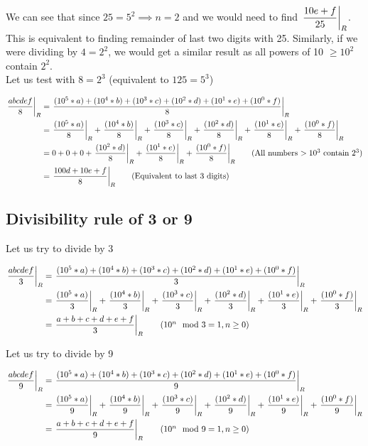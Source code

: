 We can see that since $25 = 5^2 \implies n = 2$ and we would need to find $\remFrac{10e + f}{25}$. This is equivalent to finding remainder of last two digits with 25. Similarly, if we were dividing by $4 = 2^2$, we would get a similar result as all powers of 10 $\geq 10^2$ contain $2^2$. \\

Let us test with $8 = 2^3$ (equivalent to $125 = 5^3$)

\begin{align*}
    \remFrac{abcdef}{8} &= \remFrac{(10^5 * a) + (10^4 * b) + (10^3 * c) + (10^2 * d) + (10^1 * e) + (10^0 * f)}{8} \\
    &= \remFrac{(10^5 * a)}{8} + \remFrac{(10^4 * b)}{8} + \remFrac{(10^3 * c)}{8} + \remFrac{(10^2 * d)}{8} + \remFrac{(10^1 * e)}{8} + \remFrac{(10^0 * f)}{8} \\
    &= 0 + 0 + 0 + \remFrac{(10^2 * d)}{8} + \remFrac{(10^1 * e)}{8} + \remFrac{(10^0 * f)}{8} \tag{All numbers $> 10^3$ contain $2^3$} \\
    &= \remFrac{100d + 10e + f}{8} \tag{Equivalent to last 3 digits}
\end{align*}

\subsection{Divisibility rule of 3 or 9}

Let us try to divide by 3

\begin{align*}
    \remFrac{abcdef}{3} &= \remFrac{(10^5 * a) + (10^4 * b) + (10^3 * c) + (10^2 * d) + (10^1 * e) + (10^0 * f)}{3} \\
    &= \remFrac{(10^5 * a)}{3} + \remFrac{(10^4 * b)}{3} + \remFrac{(10^3 * c)}{3} + \remFrac{(10^2 * d)}{3} + \remFrac{(10^1 * e)}{3} + \remFrac{(10^0 * f)}{3} \\
    &= \remFrac{a + b + c + d + e + f}{3} \tag{$10^n \mod 3 = 1, n \geq 0$} 
\end{align*}

Let us try to divide by 9

\begin{align*}
    \remFrac{abcdef}{9} &= \remFrac{(10^5 * a) + (10^4 * b) + (10^3 * c) + (10^2 * d) + (10^1 * e) + (10^0 * f)}{9} \\
    &= \remFrac{(10^5 * a)}{9} + \remFrac{(10^4 * b)}{9} + \remFrac{(10^3 * c)}{9} + \remFrac{(10^2 * d)}{9} + \remFrac{(10^1 * e)}{9} + \remFrac{(10^0 * f)}{9} \\
    &= \remFrac{a + b + c + d + e + f}{9} \tag{$10^n \mod 9 = 1, n \geq 0$} 
\end{align*}

